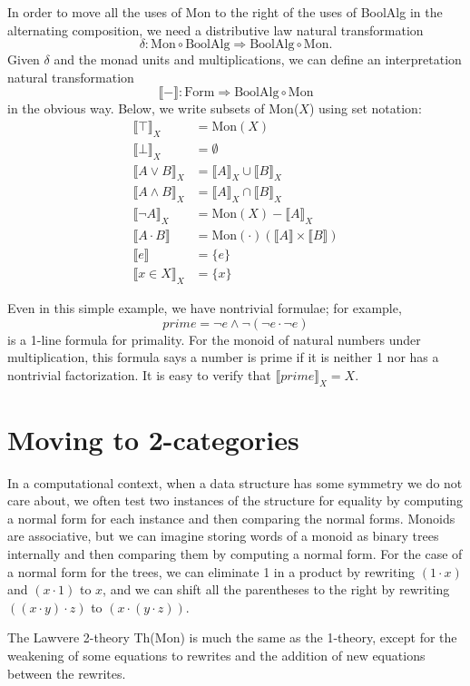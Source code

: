 \documentclass{article}
\newcommand{\interp}[1]{\llbracket #1 \rrbracket}
\newcommand{\maps}{\colon}
\newcommand{\Mon}{\mathrm{Mon}}
\newcommand{\BoolAlg}{\mathrm{BoolAlg}}
\newcommand{\Form}{\mathrm{Form}}
\begin{document}
In order to move all the uses of Mon to the right of the uses of BoolAlg in the alternating composition, we need a distributive law natural transformation
\[ \delta\maps \Mon \circ \BoolAlg \Rightarrow \BoolAlg \circ \Mon. \]
Given $\delta$ and the monad units and multiplications, we can define an interpretation natural transformation
\[ \interp{-}\maps \Form\Rightarrow \BoolAlg \circ \Mon \]
in the obvious way.  Below, we write subsets of Mon($X$) using set notation:
\begin{align*}
  \interp{\top}_X &= \Mon(X)\\
  \interp{\bot}_X &= \emptyset\\
  \interp{{A}\lor{B}}_X &= \interp{A}_X \cup \interp{B}_X\\
  \interp{{A}\land{B}}_X &= \interp{A}_X \cap \interp{B}_X\\
  \interp{\neg A}_X &= \Mon(X) - \interp{A}_X\\
  \interp{{A} \cdot {B}} &= \Mon(\cdot)(\interp{A} \times \interp{B})\\
  \interp{e} &= \{e\}\\
  \interp{x \in X}_X &= \{x\}
\end{align*}

Even in this simple example, we have nontrivial formulae; for example,
\[ prime = \neg e \land \neg(\neg e \cdot \neg e) \]
is a 1-line formula for primality.  For the monoid of natural numbers under multiplication, this formula says a number is prime if it is neither 1 nor has a nontrivial factorization.  It is easy to verify that $\interp{prime}_X = X.$

\section{Moving to 2-categories}

In a computational context, when a data structure has some symmetry we do not care about, we often test two instances of the structure for equality by computing a normal form for each instance and then comparing the normal forms.  Monoids are associative, but we can imagine storing words of a monoid as binary trees internally and then comparing them by computing a normal form.  For the case of a normal form for the trees, we can eliminate 1 in a product by rewriting $(1 \cdot x)$ and $(x \cdot 1)$ to $x$, and we can shift all the parentheses to the right by rewriting $((x \cdot y) \cdot z)$ to $(x \cdot (y \cdot z)).$

The Lawvere 2-theory Th(Mon) is much the same as the 1-theory, except for the weakening of some equations to rewrites and the addition of new equations between the rewrites.
\end{document}
